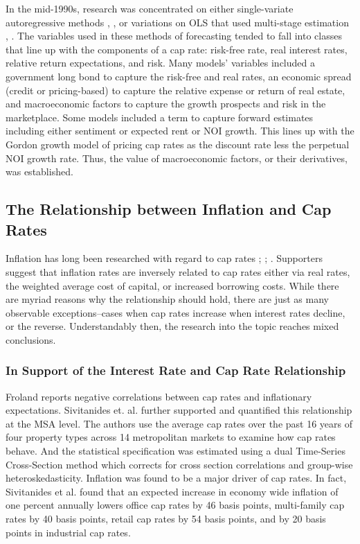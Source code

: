 In the mid-1990s, research was concentrated on either single-variate autoregressive methods \citep*{gau_1984}, \citep*{gau_1985}, \citep*{linneman_1986} or variations on OLS that used multi-stage estimation \citep*{case_shiller_1990}, \citep*{abraham_hendershott_1994}. The variables used in these methods of forecasting tended to fall into classes that line up with the components of a cap rate: risk-free rate, real interest rates, relative return expectations, and risk. Many models’ variables included a government long bond  to capture the risk-free and real rates, an economic spread (credit or pricing-based) to capture the relative expense or return of real estate, and macroeconomic factors to capture the  growth prospects and risk in the marketplace. Some models included a term to capture forward estimates including either sentiment or expected rent or NOI growth. This lines up with the Gordon growth model of pricing cap rates as the discount rate less the perpetual NOI growth rate. Thus, the value of macroeconomic factors, or their derivatives, was established.

\subsection{The Relationship between Inflation and Cap Rates}

Inflation has long been researched with regard to cap rates \citep*{froland1987determines}; \citep*{sivitanides2001determinants}; \citep*{chandrashekaran2000predictability}. Supporters suggest that inflation rates are inversely related to cap rates either via real rates, the weighted average  cost of capital, or increased borrowing costs. While there are myriad reasons why the relationship should hold, there are just as many observable exceptions--cases when cap rates increase when interest rates decline, or the reverse. Understandably then, the research into the topic reaches mixed conclusions.

\subsubsection{In Support of the Interest Rate and Cap Rate Relationship}
Froland \citep*{froland1987determines} reports negative correlations between cap rates and inflationary expectations. Sivitanides et. al. \citep*{sivitanides2001determinants} further supported and quantified this relationship at the MSA level. The authors use the average cap rates over the past 16 years of four property types across 14 metropolitan markets to examine how cap rates behave. And the statistical specification was estimated using a dual Time-Series Cross-Section method which corrects for cross section correlations and group-wise heteroskedasticity. Inflation was found to be a major driver of cap rates. In fact, Sivitanides et al. found that an expected increase in economy wide inflation of one percent annually lowers office cap rates by 46 basis points, multi-family cap rates by 40 basis points, retail cap rates by 54 basis points, and by 20 basis points in industrial cap rates.

